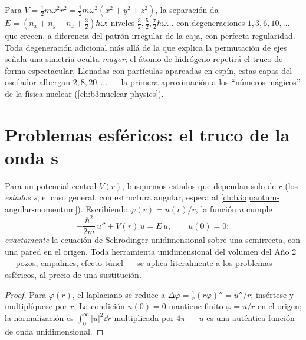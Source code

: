\begin{example}\label{ex:b3:schrodinger-three-dimensions:oscillator}
Para $V = \tfrac12 m\omega^2r^2 = \tfrac12 m\omega^2(x^2 + y^2 +
z^2)$, la separación da $E = (n_x + n_y + n_z + \tfrac32)\hbar\omega$:
niveles $\tfrac32, \tfrac52, \tfrac72\hbar\omega\ldots$ con
degeneraciones $1, 3, 6, 10, \dots$ --- que crecen, a diferencia del patrón
irregular de la caja, con perfecta regularidad. Toda degeneración adicional
más allá de la que explica la permutación de ejes señala una simetría oculta
\emph{mayor}; el átomo de hidrógeno repetirá el truco de forma
espectacular. Llenadas con partículas apareadas en espín, estas capas del
oscilador albergan $2,
8, 20, \dots$ --- la primera aproximación a los
``números mágicos'' de la física nuclear (\cref{ch:b3:nuclear-physics}).
\end{example}

\section{Problemas esféricos: el truco de la onda s}

\begin{proposition}\label{prop:b3:schrodinger-three-dimensions:swave}
Para un potencial central $V(r)$, busquemos estados que dependan solo de $r$
(los \emph{estados s}; el caso general, con estructura angular, espera al
\cref{ch:b3:quantum-angular-momentum}). Escribiendo
$\varphi(r) = u(r)/r$, la función $u$ cumple
\[
-\frac{\hbar^2}{2m}\,u'' + V(r)\,u = E\,u ,
\qquad u(0) = 0 :
\]
\emph{exactamente} la ecuación de Schrödinger unidimensional sobre una
semirrecta, con una pared en el origen. Toda herramienta unidimensional del
volumen del Año 2 --- pozos, empalmes, efecto túnel --- se aplica
literalmente a los problemas esféricos, al precio de una sustitución.
\end{proposition}

\begin{proof}
Para $\varphi(r)$, el laplaciano se reduce a $\Delta\varphi =
\tfrac1r(r\varphi)'' = u''/r$; insértese y multiplíquese por $r$. La
condición $u(0) = 0$ mantiene finito $\varphi = u/r$ en el origen; la
normalización es $\int_0^\infty|u|^2\dd r$ multiplicada por $4\pi$ --- $u$
es una auténtica función de onda unidimensional.
\end{proof}

